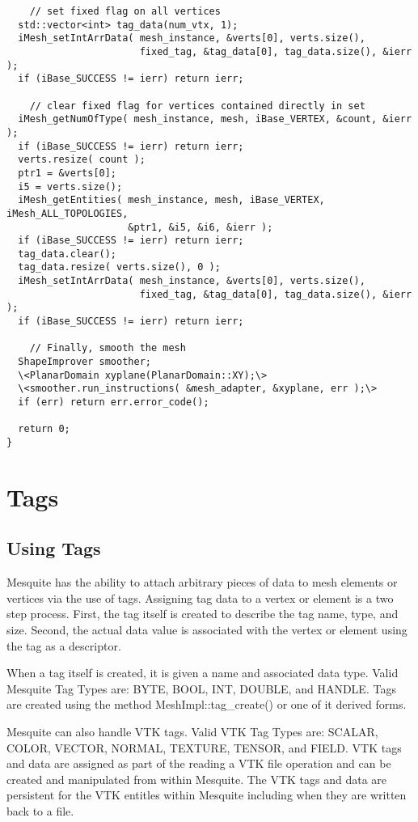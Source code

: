 \begin{lstlisting}
    // set fixed flag on all vertices
  std::vector<int> tag_data(num_vtx, 1);
  iMesh_setIntArrData( mesh_instance, &verts[0], verts.size(), 
                       fixed_tag, &tag_data[0], tag_data.size(), &ierr );
  if (iBase_SUCCESS != ierr) return ierr;

    // clear fixed flag for vertices contained directly in set
  iMesh_getNumOfType( mesh_instance, mesh, iBase_VERTEX, &count, &ierr );
  if (iBase_SUCCESS != ierr) return ierr;
  verts.resize( count );
  ptr1 = &verts[0];
  i5 = verts.size();
  iMesh_getEntities( mesh_instance, mesh, iBase_VERTEX, iMesh_ALL_TOPOLOGIES,
                     &ptr1, &i5, &i6, &ierr );
  if (iBase_SUCCESS != ierr) return ierr;
  tag_data.clear();
  tag_data.resize( verts.size(), 0 );
  iMesh_setIntArrData( mesh_instance, &verts[0], verts.size(), 
                       fixed_tag, &tag_data[0], tag_data.size(), &ierr );
  if (iBase_SUCCESS != ierr) return ierr;

    // Finally, smooth the mesh
  ShapeImprover smoother;
  \<PlanarDomain xyplane(PlanarDomain::XY);\>
  \<smoother.run_instructions( &mesh_adapter, &xyplane, err );\>
  if (err) return err.error_code();

  return 0;
}
\end{lstlisting}

\section{Tags} \label{sec:tags_section}

\subsection{Using Tags}

Mesquite has the ability to attach arbitrary pieces of data to mesh elements or vertices via the use of tags.  Assigning tag data to a vertex or element is a two step process.  First, the tag itself is created to describe the tag name, type, and size.  Second, the actual data value is associated with the vertex or element using the tag as a descriptor.

When a tag itself is created, it is given a name and associated data type.  Valid Mesquite Tag Types are: BYTE, BOOL, INT, DOUBLE, and HANDLE. Tags are created using the method MeshImpl::tag\_create() or one of it derived forms.

Mesquite can also handle VTK tags.  Valid VTK Tag Types are: SCALAR, COLOR, VECTOR, NORMAL, TEXTURE, TENSOR, and FIELD. VTK tags and data are assigned as part of the reading a VTK file operation and can be created and manipulated from within Mesquite.  The VTK tags and data are persistent for the VTK entitles within Mesquite including when they are written back to a file.

